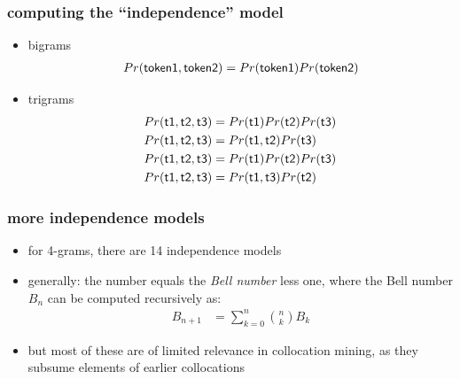 \documentclass[11pt,handout]{beamer}
\begin{document}
\begin{frame}
 \frametitle{computing the ``independence'' model}
 \vspace*{1em}
 \begin{itemize}
  \setlength{\itemsep}{2em}
  \item \alert{bigrams}
        \begin{align*}
         Pr(\mathsf{token1}, \mathsf{token2}) = Pr(\mathsf{token1})\/Pr(\mathsf{token2})
        \end{align*}
  \item \alert{trigrams}
        \begin{align*}
         Pr(\mathsf{t1}, \mathsf{t2}, \mathsf{t3}) & = Pr(\mathsf{t1})\/Pr(\mathsf{t2})\/Pr(\mathsf{t3}) \\
         Pr(\mathsf{t1}, \mathsf{t2}, \mathsf{t3}) & = Pr(\mathsf{t1}, \mathsf{t2})\/Pr(\mathsf{t3})     \\
         Pr(\mathsf{t1}, \mathsf{t2}, \mathsf{t3}) & = Pr(\mathsf{t1})\/Pr(\mathsf{t2})\/Pr(\mathsf{t3}) \\
         Pr(\mathsf{t1}, \mathsf{t2}, \mathsf{t3}) & = Pr(\mathsf{t1}, \mathsf{t3})\/Pr(\mathsf{t2})
        \end{align*}

 \end{itemize}
\end{frame}

\begin{frame}
 \frametitle{more independence models}
 \begin{itemize}
  \setlength{\itemsep}{2em}
  \item for 4-grams, there are 14 independence models
        \pause
  \item generally: the number equals the \emph{Bell number}
        less one, where the Bell number $B_n$ can be computed recursively as:
        \begin{align*}
         B_{n+1} & = \sum_{k=0}^n \binom{n}{k} B_k
        \end{align*}
        \pause \item but most of these are of limited relevance in collocation
        mining, as they subsume elements of earlier collocations
 \end{itemize}
\end{frame}
\end{document}
